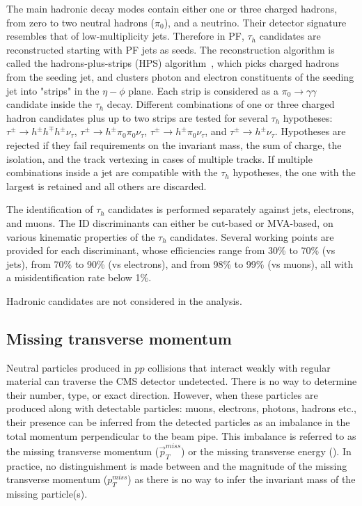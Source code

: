 The main hadronic \tau{} decay modes contain either one or three charged hadrons, from zero to two neutral hadrons ($\pi_{0}$), and a neutrino.
Their detector signature resembles that of low-multiplicity jets.
Therefore in PF, $\tau_{h}$ candidates are reconstructed starting with PF jets as seeds. 
The reconstruction algorithm is called the hadrons-plus-strips (HPS) algorithm~\cite{tau2016, tau2018},
which picks charged hadrons from the seeding jet, and clusters photon and electron constituents of the seeding jet into "strips" in the $\eta-\phi$ plane.
Each strip is considered as a $\pi_{0} \to \gamma\gamma$ candidate inside the $\tau_{h}$ decay.
Different combinations of one or three charged hadron candidates plus up to two strips are tested for several $\tau_{h}$ hypotheses:
$\tau^{\pm} \to h^{\pm}h^{\mp}h^{\pm}\nu_{\tau}$, $\tau^{\pm} \to h^{\pm}\pi_{0}\pi_{0}\nu_{\tau}$,
$\tau^{\pm} \to h^{\pm}\pi_{0}\nu_{\tau}$, and $\tau^{\pm} \to h^{\pm}\nu_{\tau}$.
Hypotheses are rejected if they fail requirements on the invariant mass, the sum of charge, the isolation, and the track vertexing in cases of multiple tracks.
If multiple combinations inside a jet are compatible with the $\tau_{h}$ hypotheses, the one with the largest \pt is retained and all others are discarded.

The identification of $\tau_{h}$ candidates is performed separately against jets, electrons, and muons.
The ID discriminants can either be cut-based or MVA-based, on various kinematic properties of the $\tau_{h}$ candidates.
Several working points are provided for each discriminant, whose efficiencies range from 30\% to 70\% (vs jets), from 70\% to 90\% (vs electrons), and from 98\% to 99\% (vs muons),
all with a misidentification rate below 1\%.

Hadronic \tau{} candidates are not considered in the \hmm analysis.

\subsection{Missing transverse momentum}\label{sec:reco_met}

Neutral particles produced in $pp$ collisions that interact weakly with regular material can traverse the CMS detector undetected.
There is no way to determine their number, type, or exact direction.
However, when these particles are produced along with detectable particles: muons, electrons, photons, hadrons etc.,
their presence can be inferred from the detected particles as an imbalance in the total momentum perpendicular to the beam pipe.
This imbalance is referred to as the missing transverse momentum ($\vec{p}^{miss}_{T}$) or the missing transverse energy (\MET).
In practice, no distinguishment is made between \MET and the magnitude of the missing transverse momentum ($p^{miss}_{T}$) 
as there is no way to infer the invariant mass of the missing particle(s).

